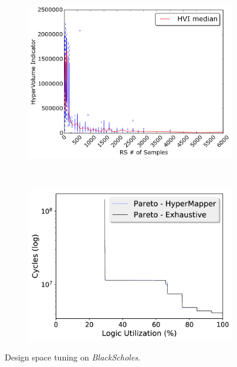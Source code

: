 

\begin{figure}
\centering
\begin{subfigure}[t]{0.45\linewidth}
\includegraphics[width=\linewidth]{images/DSE/hvi_5NumberSummary_median.png}
\label{hvi_samples}
\end{subfigure}\hspace{15pt}
~
\begin{subfigure}[t]{0.45\linewidth}
\includegraphics[clip, trim=0.0cm 0.0cm 0.0cm 0.0cm, width=\linewidth]{figs/output_pareto_blackscholes.pdf}
\label{paretos}
\end{subfigure}

\vspace{-10pt}
\caption{Design space tuning on \emph{BlackScholes}.}
\label{figHVI}
\end{figure}

